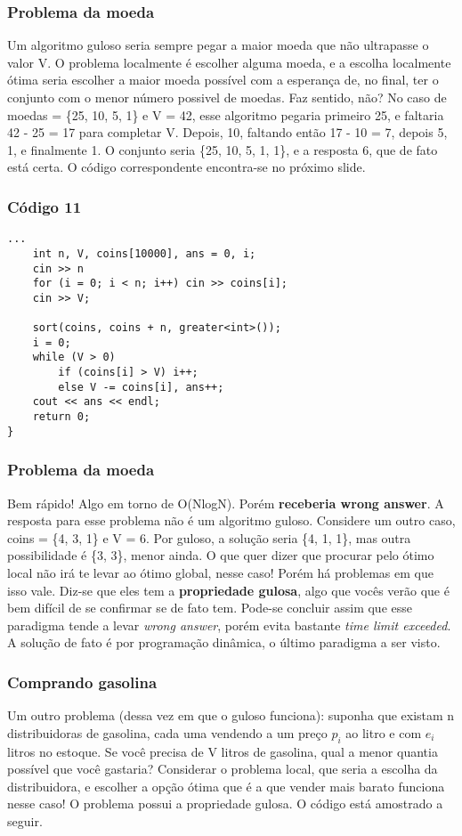 \documentclass{beamer}
\begin{document}
	\begin{frame}
	\frametitle{Problema da moeda}
		Um algoritmo guloso seria sempre pegar a maior moeda
		que não ultrapasse o valor V. O problema localmente é escolher
		alguma moeda, e a escolha localmente ótima seria escolher a
		maior moeda possível com a esperança de, no final, ter o
		conjunto com o menor número possivel de moedas. Faz sentido,
		não? No caso de moedas = \{25, 10, 5, 1\} e V = 42, esse
		algoritmo pegaria primeiro 25, e faltaria 42 - 25 = 17 para
		completar V. Depois, 10, faltando então 17 - 10 = 7, depois 5,
		1, e finalmente 1. O conjunto seria \{25, 10, 5, 1, 1\}, e a
		resposta 6, que de fato está certa. O código correspondente
		encontra-se no próximo slide.
	\end{frame}

	\begin{frame}[fragile]
	\frametitle{Código 11}
		\begin{lstlisting}
...
    int n, V, coins[10000], ans = 0, i;
    cin >> n
    for (i = 0; i < n; i++) cin >> coins[i];
    cin >> V;

    sort(coins, coins + n, greater<int>());
    i = 0;
    while (V > 0)
        if (coins[i] > V) i++;
        else V -= coins[i], ans++;
    cout << ans << endl;
    return 0;
}
		\end{lstlisting}
	\end{frame}

	\begin{frame}
	\frametitle{Problema da moeda}
		Bem rápido! Algo em torno de O(NlogN). Porém
		\textbf{receberia wrong answer}. A resposta para esse problema não é
		um algoritmo guloso. Considere um outro caso, coins = \{4, 3,
		1\} e V = 6. Por guloso, a solução seria \{4, 1, 1\}, mas outra
		possibilidade é \{3, 3\}, menor ainda. O que quer dizer que
		procurar pelo ótimo local não irá te levar ao ótimo global, nesse
		caso! Porém há problemas em que isso vale. Diz-se que eles
		tem a \textbf{propriedade gulosa}, algo que vocês verão que é bem
		difícil de se confirmar se de fato tem. Pode-se concluir assim
		que esse paradigma tende a levar \textit{wrong answer}, porém evita
		bastante \textit{time limit exceeded}. A solução de fato é por
		programação dinâmica, o último paradigma a ser visto.
	\end{frame}

	\begin{frame}
	\frametitle{Comprando gasolina}
		Um outro problema (dessa vez em que o guloso funciona):
		suponha que existam n distribuidoras de gasolina, cada uma
		vendendo a um preço $p_i$ ao litro e com $e_i$ litros no estoque. Se
		você precisa de V litros de gasolina, qual a menor quantia
		possível que você gastaria? Considerar o problema local, que
		seria a escolha da distribuidora, e escolher a opção ótima que é
		a que vender mais barato funciona nesse caso! O problema
		possui a propriedade gulosa. O código está amostrado a seguir.
	\end{frame}
\end{document}
